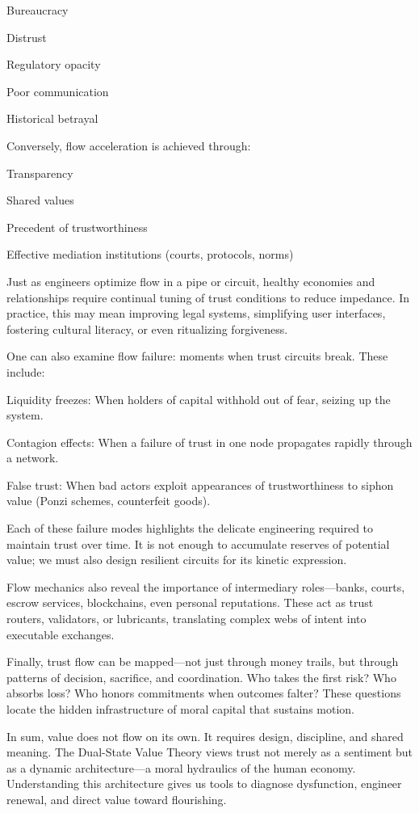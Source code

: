 \documentclass[11pt,oneside]{book}
\begin{document}
    Bureaucracy

    Distrust

    Regulatory opacity

    Poor communication

    Historical betrayal

Conversely, flow acceleration is achieved through:

    Transparency

    Shared values

    Precedent of trustworthiness

    Effective mediation institutions (courts, protocols, norms)

Just as engineers optimize flow in a pipe or circuit, healthy economies and relationships require continual tuning of trust conditions to reduce impedance. In practice, this may mean improving legal systems, simplifying user interfaces, fostering cultural literacy, or even ritualizing forgiveness.

One can also examine flow failure: moments when trust circuits break. These include:

    Liquidity freezes: When holders of capital withhold out of fear, seizing up the system.

    Contagion effects: When a failure of trust in one node propagates rapidly through a network.

    False trust: When bad actors exploit appearances of trustworthiness to siphon value (Ponzi schemes, counterfeit goods).

Each of these failure modes highlights the delicate engineering required to maintain trust over time. It is not enough to accumulate reserves of potential value; we must also design resilient circuits for its kinetic expression.

Flow mechanics also reveal the importance of intermediary roles—banks, courts, escrow services, blockchains, even personal reputations. These act as trust routers, validators, or lubricants, translating complex webs of intent into executable exchanges.

Finally, trust flow can be mapped—not just through money trails, but through patterns of decision, sacrifice, and coordination. Who takes the first risk? Who absorbs loss? Who honors commitments when outcomes falter? These questions locate the hidden infrastructure of moral capital that sustains motion.

In sum, value does not flow on its own. It requires design, discipline, and shared meaning. The Dual-State Value Theory views trust not merely as a sentiment but as a dynamic architecture—a moral hydraulics of the human economy. Understanding this architecture gives us tools to diagnose dysfunction, engineer renewal, and direct value toward flourishing.
\end{document}
